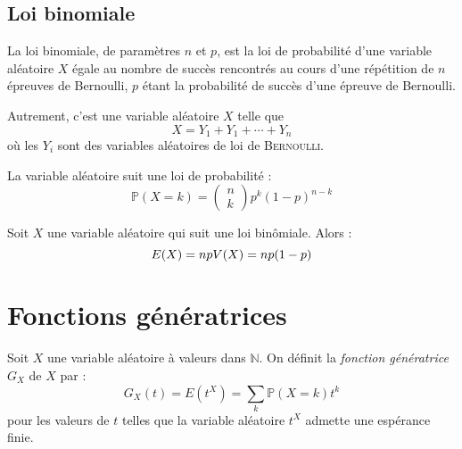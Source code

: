 \documentclass[11pt,a4paper,fleqn,pdftex]{report}
\begin{document}
\subsection{Loi binomiale} %
\label{sub:loi_binomiale}
\begin{dfn}
     La loi binomiale, de paramètres $n$ et $p$, est la loi de probabilité d'une variable aléatoire $X$ égale au nombre de succès rencontrés au cours d'une répétition de $n$ épreuves de Bernoulli, $p$ étant la probabilité de succès d'une épreuve de Bernoulli.\par
     Autrement, c'est une variable aléatoire $X$ telle que 
     \[
         X = Y_1 + Y_1 + \cdots + Y_n
     \]
     où les $Y_i$ sont des variables aléatoires  de loi de \textsc{Bernoulli}.\par
     La variable aléatoire suit une loi de probabilité : 
     \begin{equation}
     \mathbb{P}(X = k) = \begin{pmatrix} n \\ k \end{pmatrix} p^k(1-p)^{n-k}
     \end{equation}
\end{dfn}
\begin{theorem}
     Soit $X$ une variable aléatoire qui suit une loi binômiale. Alors :
     \begin{equation}
     E(X) = np \\ V(X) = np(1-p)
     \end{equation}
\end{theorem}
\section{Fonctions génératrices} %
\label{sec:fonctions_generatrices}
\begin{dfn} %
     Soit $X$ une variable aléatoire à valeurs dans $\mathbb{N}$. On définit la \emph{fonction génératrice} $G_X$ de $X$ par : 
     \begin{equation}
     G_X (t) = E(t^X) = \sum_k \mathbb{P} (X=k) t^k
     \end{equation}
     pour les valeurs de $t$ telles que la variable aléatoire $t^X$ admette une espérance finie.
\end{dfn}
\end{document}
